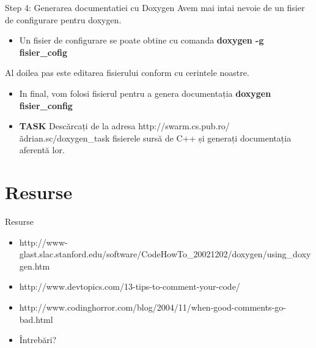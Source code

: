 \documentclass{beamer}
\begin{document}
\begin{frame}{Step 4: Generarea documentatiei cu Doxygen}
	Avem mai intai nevoie de un fisier de configurare pentru doxygen.
	\pause
	\begin{itemize}
		\item Un fisier de configurare se poate obtine cu comanda {\bf doxygen -g fisier\_cofig}
	\end{itemize}
	\pause
	Al doilea pas este editarea fisierului conform cu cerintele noastre.
	\pause
	\begin{itemize}
		\item In final, vom folosi fisierul pentru a genera documentația {\bf doxygen fisier\_config}
	\end{itemize}
	\pause
	\begin{itemize}
		\item {\bf TASK} Descărcați de la adresa http://swarm.cs.pub.ro/\~adrian.sc/doxygen\_task fisierele sursă de C++ și generați documentația aferentă lor.
	\end{itemize}
\end{frame}

\section{Resurse}

\begin{frame}{Resurse}
  \begin{itemize}
  \item http://www-glast.slac.stanford.edu/software/CodeHowTo\_20021202/doxygen/using\_doxygen.htm
  \pause
  \item http://www.devtopics.com/13-tips-to-comment-your-code/
  \pause
  \item http://www.codinghorror.com/blog/2004/11/when-good-comments-go-bad.html  
  \pause
  \vspace{10mm}
  \item Întrebări?
  \end{itemize}
\end{frame}

\begin{frame}{}
\end{frame}
\end{document}
